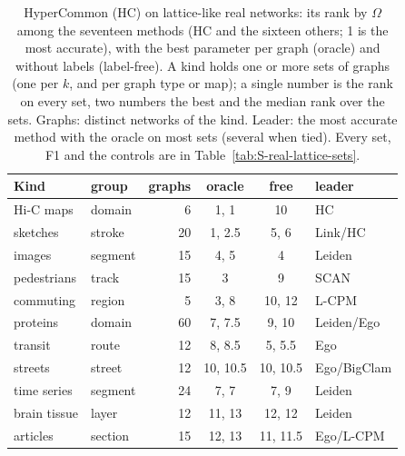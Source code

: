 \begin{table}[t]
\caption{HyperCommon (HC) on lattice-like real networks: its rank by $\Omega$ among the seventeen methods (HC and the sixteen others; 1 is the most accurate), with the best parameter per graph (oracle) and without labels (label-free). A kind holds one or more sets of graphs (one per $k$, and per graph type or map); a single number is the rank on every set, two numbers the best and the median rank over the sets. Graphs: distinct networks of the kind. Leader: the most accurate method with the oracle on most sets (several when tied). Every set, F1 and the controls are in Table~\ref{tab:S-real-lattice-sets}.}
\label{tab:real-lattice}
\scriptsize\setlength{\tabcolsep}{3pt}
\begin{ruledtabular}
\begin{tabular}{llrccl}
Kind & group & graphs & oracle & free & leader \\
\hline
Hi-C maps & domain & 6 & 1, 1 & 10 & HC \\
sketches & stroke & 20 & 1, 2.5 & 5, 6 & Link/HC \\
images & segment & 15 & 4, 5 & 4 & Leiden \\
pedestrians & track & 15 & 3 & 9 & SCAN \\
commuting & region & 5 & 3, 8 & 10, 12 & L-CPM \\
proteins & domain & 60 & 7, 7.5 & 9, 10 & Leiden/Ego \\
transit & route & 12 & 8, 8.5 & 5, 5.5 & Ego \\
streets & street & 12 & 10, 10.5 & 10, 10.5 & Ego/BigClam \\
time series & segment & 24 & 7, 7 & 7, 9 & Leiden \\
brain tissue & layer & 12 & 11, 13 & 12, 12 & Leiden \\
articles & section & 15 & 12, 13 & 11, 11.5 & Ego/L-CPM \\
\end{tabular}
\end{ruledtabular}
\end{table}
